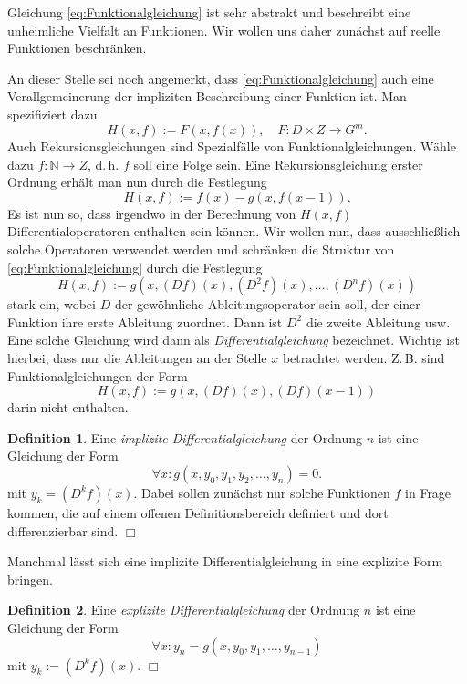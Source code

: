 \documentclass[a4paper,10pt,fleqn,twocolumn,twoside,openany]{article}
\numberwithin{equation}{section}
\newcommand{\N}{\mathbb N}
\theoremstyle{definition}
\newtheorem{Definition}{Definition}
\begin{document}
Gleichung \eqref{eq:Funktionalgleichung} ist sehr abstrakt und
beschreibt eine unheimliche Vielfalt an Funktionen.
Wir wollen uns daher zunächst auf reelle Funktionen beschränken.

An dieser Stelle sei noch angemerkt, dass
\eqref{eq:Funktionalgleichung} auch eine Verallgemeinerung der
impliziten Beschreibung einer Funktion ist. Man spezifiziert dazu
\begin{equation}
H(x,f) := F(x,f(x)),\quad F\colon D\times Z\to G^m.
\end{equation}
Auch Rekursionsgleichungen sind Spezialfälle von
Funktionalgleichungen. Wähle dazu $f\colon\N\to Z$, d.\,h. $f$ soll
eine Folge sein. Eine Rekursionsgleichung erster Ordnung erhält man
nun durch die Festlegung
\begin{equation}
H(x,f) := f(x)-g(x,f(x-1)).
\end{equation}
Es ist nun so, dass irgendwo in der Berechnung von $H(x,f)$
Differentialoperatoren enthalten sein können. Wir wollen nun,
dass ausschließlich solche Operatoren verwendet werden
und schränken die Struktur von \eqref{eq:Funktionalgleichung}
durch die Festlegung
\begin{equation}
H(x,f) := g(x,(Df)(x),(D^2 f)(x),\ldots,(D^n f)(x))
\end{equation}
stark ein, wobei $D$ der gewöhnliche Ableitungsoperator sein soll,
der einer Funktion ihre erste Ableitung zuordnet. Dann ist $D^2$ die
zweite Ableitung usw. Eine solche Gleichung wird dann als
\emph{Differentialgleichung} bezeichnet. Wichtig ist hierbei,
dass nur die Ableitungen an der Stelle $x$ betrachtet werden.
Z.\,B. sind Funktionalgleichungen der Form
\begin{equation}
H(x,f) := g(x,(Df)(x),(Df)(x-1))
\end{equation}
darin nicht enthalten.
\begin{Definition}
Eine \emph{implizite Differentialgleichung} der Ordnung $n$
ist eine Gleichung der Form
\begin{equation}
\forall x\colon g(x,y_0,y_1,y_2,\ldots,y_n)=0.
\end{equation}
mit $y_k=(D^k f)(x)$. Dabei sollen zunächst nur solche Funktionen $f$
in Frage kommen, die auf einem offenen Definitionsbereich
definiert und dort differenzierbar sind. $\Box$
\end{Definition}
\noindent
Manchmal lässt sich eine implizite Differentialgleichung
in eine explizite Form bringen.
\begin{Definition}
Eine \emph{explizite Differentialgleichung} der Ordnung $n$
ist eine Gleichung der Form
\begin{equation}
\forall x\colon y_n = g(x,y_0,y_1,\ldots,y_{n-1})
\end{equation}
mit $y_k:=(D^k f)(x)$. $\Box$
\end{Definition}
\end{document}
